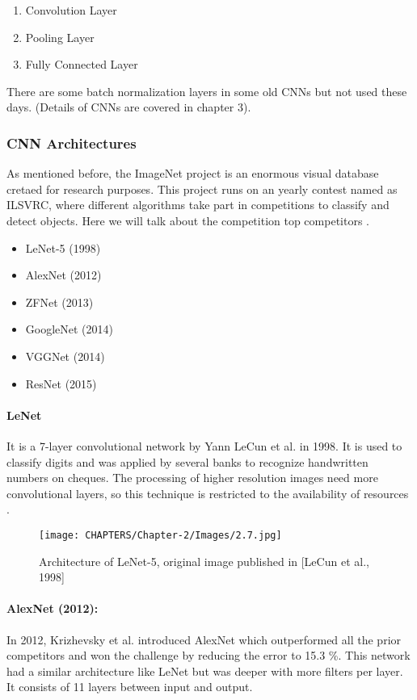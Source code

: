 \begin{enumerate}
	\item Convolution Layer
	\item Pooling Layer
	\item Fully Connected Layer

\end{enumerate}
There are some batch normalization layers in some old CNNs 
but not used these days. (Details of CNNs are covered in chapter 3).

\subsubsection{CNN Architectures}
As mentioned before, the ImageNet project is an enormous visual database cretaed for research purposes. This 
project runs on an yearly contest named as ILSVRC, where different algorithms take 
part in competitions to classify and detect objects. Here 
we will talk about the competition top competitors \cite{chap_2_article:9}.
\begin{itemize}
	\item LeNet-5 (1998)
	\item AlexNet (2012)
	\item ZFNet (2013)
	\item GoogleNet (2014)
	\item VGGNet (2014)
	\item ResNet (2015)
\end{itemize}
\paragraph*{LeNet}

It is a 7-layer convolutional network by 
Yann LeCun et al. in 1998. It is used to classify digits and was applied by 
several banks to recognize handwritten numbers on cheques. The processing 
of higher resolution images need more convolutional layers, so this 
technique is restricted to the availability of resources \cite{chap_2_article:10}.

\begin{figure}[H]
	\centering
	\captionsetup{justification=centering,margin=2cm}
	\texttt{[image: CHAPTERS/Chapter-2/Images/2.7.jpg]}
	\caption{Architecture of LeNet-5, original image published in [LeCun et al., 1998]}
	\label{fig:2.7}
\end{figure}


\paragraph*{AlexNet (2012):}
In 2012, Krizhevsky et al. introduced AlexNet which 
outperformed all the prior competitors and won the challenge 
by reducing the error to 15.3 \%.  This network had a similar architecture 
like LeNet but was deeper with more filters per layer. It 
consists of 11 layers between input and output. 

